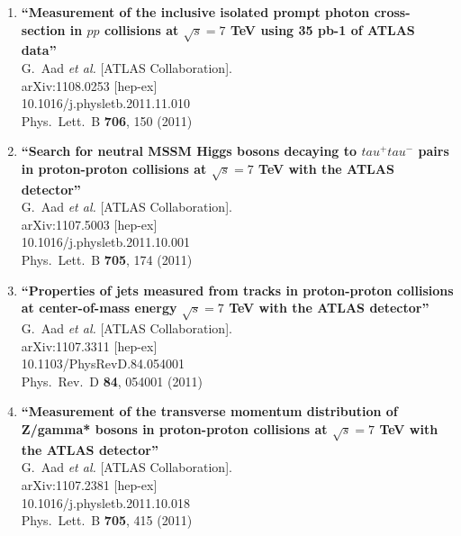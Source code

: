 \documentclass{article}
\begin{document}
\begin{enumerate}
\item%
{\bf ``Measurement of the inclusive isolated prompt photon cross-section in $pp$ collisions at $\sqrt{s}=7$ TeV using 35 pb-1 of ATLAS data''}
  \\{}G.~Aad {\it et al.}  [ATLAS Collaboration].
  \\{}arXiv:1108.0253 [hep-ex]
    \\{}10.1016/j.physletb.2011.11.010
\\{}Phys.\ Lett.\ B {\bf 706}, 150 (2011) %


\item%
{\bf ``Search for neutral MSSM Higgs bosons decaying to $tau^+ tau^-$ pairs in proton-proton collisions at $\sqrt{s}=7$ TeV with the ATLAS detector''}
  \\{}G.~Aad {\it et al.}  [ATLAS Collaboration].
  \\{}arXiv:1107.5003 [hep-ex]
    \\{}10.1016/j.physletb.2011.10.001
\\{}Phys.\ Lett.\ B {\bf 705}, 174 (2011) %


\item%
{\bf ``Properties of jets measured from tracks in proton-proton collisions at center-of-mass energy $\sqrt{s}=7$ TeV with the ATLAS detector''}
  \\{}G.~Aad {\it et al.}  [ATLAS Collaboration].
  \\{}arXiv:1107.3311 [hep-ex]
    \\{}10.1103/PhysRevD.84.054001
\\{}Phys.\ Rev.\ D {\bf 84}, 054001 (2011) %


\item%
{\bf ``Measurement of the transverse momentum distribution of Z/gamma* bosons in proton-proton collisions at $\sqrt{s}=7$ TeV with the ATLAS detector''}
  \\{}G.~Aad {\it et al.}  [ATLAS Collaboration].
  \\{}arXiv:1107.2381 [hep-ex]
    \\{}10.1016/j.physletb.2011.10.018
\\{}Phys.\ Lett.\ B {\bf 705}, 415 (2011) %



\end{enumerate}
\end{document}
